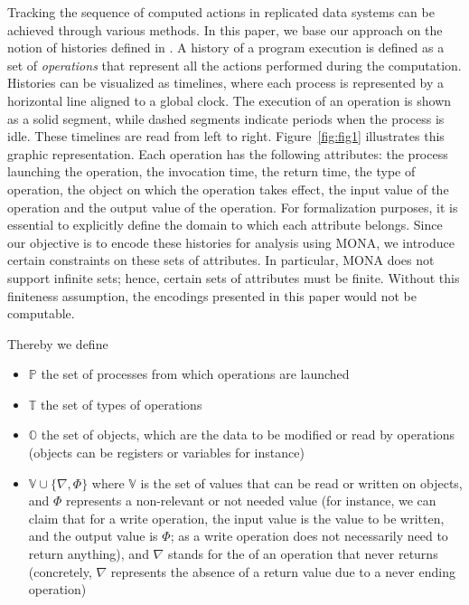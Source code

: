 \documentclass[12pt]{article}
\begin{document}
Tracking the sequence of computed actions in replicated data systems can be achieved through various methods. In this paper, we base our approach on the notion of histories defined in . A history of a program execution is defined as a set of \textsl{operations} that represent all the actions performed during the computation. Histories can be visualized as timelines, where each process is represented by a horizontal line aligned to a global clock. The execution of an operation is shown as a solid segment, while dashed segments indicate periods when the process is idle. These timelines are read from left to right. Figure~\ref{fig:fig1} illustrates this graphic representation.
 Each operation has the following attributes: the process launching the operation, the invocation time, the return time, the type of operation, the object on which the operation takes effect, the input value of the operation and the output value of the operation. For formalization purposes, it is essential to explicitly define the domain to which each attribute belongs.
Since our objective is to encode these histories for analysis using MONA, we introduce certain constraints on these sets of attributes. In particular, MONA does not support infinite sets; hence, certain sets of attributes must be finite. Without this finiteness assumption, the encodings presented in this paper would not be computable.

Thereby we define

\begin{itemize}[label=$\ast$,itemsep=0pt,parsep=0pt]
	\item $\mathbb{P}$ the set of processes from which operations are launched
	\item $\mathbb{T}$ the set of types of operations
	\item $\mathbb{O}$ the set of objects, which are the data to be modified or read by operations (objects can be registers or variables for instance)
	\item $\mathbb{V}\cup\{\nabla,\Phi\}$ where $\mathbb{V}$ is the set of values that can be read or written on objects, and $\Phi$ represents a non-relevant or not needed value (for instance, we can claim that for a write operation, the input value is the value to be written, and the output value is $\Phi$; as a write operation does not necessarily need to return anything), and $\nabla$ stands for the  of an operation that never returns (concretely, $\nabla$ represents the absence of a return value due to a never ending operation)
\end{itemize}
\end{document}
